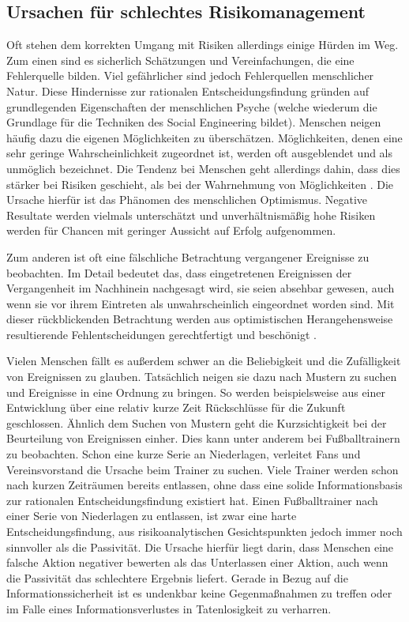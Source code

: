 \subsection{Ursachen für schlechtes Risikomanagement}\label{sec:ursachen}
Oft stehen dem korrekten Umgang mit Risiken allerdings einige Hürden im Weg.
Zum einen sind es sicherlich Schätzungen und Vereinfachungen, die eine Fehlerquelle bilden.
Viel gefährlicher sind jedoch Fehlerquellen menschlicher Natur.
Diese Hindernisse zur rationalen Entscheidungsfindung gründen auf grundlegenden Eigenschaften der menschlichen Psyche (welche wiederum die Grundlage für die Techniken des Social Engineering bildet).
Menschen neigen häufig dazu die eigenen Möglichkeiten zu überschätzen.
Möglichkeiten, denen eine sehr geringe Wahrscheinlichkeit zugeordnet ist, werden oft ausgeblendet und
als unmöglich bezeichnet.
Die Tendenz bei Menschen geht allerdings dahin, dass dies stärker bei Risiken geschieht, als bei der
Wahrnehmung von Möglichkeiten \citep{risikomanagement}.
Die Ursache hierfür ist das Phänomen des menschlichen Optimismus.
Negative Resultate werden vielmals unterschätzt und unverhältnismäßig hohe Risiken werden für Chancen
mit geringer Aussicht auf Erfolg aufgenommen.

Zum anderen ist oft eine fälschliche Betrachtung vergangener Ereignisse zu beobachten.
Im Detail bedeutet das, dass eingetretenen Ereignissen der Vergangenheit im Nachhinein nachgesagt
wird, sie seien absehbar gewesen, auch wenn sie vor ihrem Eintreten als unwahrscheinlich eingeordnet
worden sind.
Mit dieser rückblickenden Betrachtung werden aus optimistischen Herangehensweise resultierende
Fehlentscheidungen gerechtfertigt und beschönigt \citep{risikomanagement}.

Vielen Menschen fällt es außerdem schwer an die Beliebigkeit und die Zufälligkeit von Ereignissen zu
glauben.
Tatsächlich neigen sie dazu nach Mustern zu suchen und Ereignisse in eine Ordnung zu bringen.
So werden beispielsweise aus einer Entwicklung über eine relativ kurze Zeit Rückschlüsse für die Zukunft geschlossen.
Ähnlich dem Suchen von Mustern geht die Kurzsichtigkeit bei der Beurteilung von Ereignissen einher.
Dies kann unter anderem bei Fußballtrainern zu beobachten.
Schon eine kurze Serie an Niederlagen, verleitet Fans und Vereinsvorstand die Ursache beim Trainer zu
suchen.
Viele Trainer werden schon nach kurzen Zeiträumen bereits entlassen, ohne dass eine solide
Informationsbasis zur rationalen Entscheidungsfindung existiert hat.
Einen Fußballtrainer nach einer Serie von Niederlagen zu entlassen, ist zwar eine harte
Entscheidungsfindung, aus risikoanalytischen Gesichtspunkten jedoch immer noch sinnvoller als die
Passivität.
Die Ursache hierfür liegt darin, dass Menschen eine falsche Aktion negativer bewerten als das
Unterlassen einer Aktion, auch wenn die Passivität das schlechtere Ergebnis liefert.
Gerade in Bezug auf die Informationssicherheit ist es undenkbar keine Gegenmaßnahmen zu treffen oder
im Falle eines Informationsverlustes in Tatenlosigkeit zu verharren.

